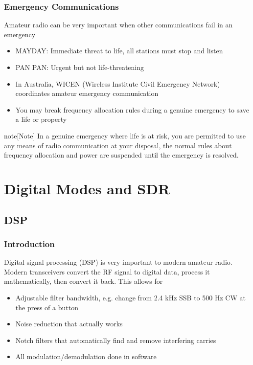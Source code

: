 \documentclass{article}
\begin{document}
\subsubsection{Emergency Communications}
Amateur radio can be very important when other communications fail in an emergency
\begin{itemize}
    \item MAYDAY: Immediate threat to life, all stations must stop and listen
    \item PAN PAN: Urgent but not life-threatening
    \item In Australia, WICEN (Wireless Institute Civil Emergency Network) coordinates amateur emergency communication
    \item You may break frequency allocation rules during a genuine emergency to save a life or property
\end{itemize}

\begin{callout}{note}[Note]
    In a genuine emergency where life is at risk, you are permitted to use any means of radio communication at your disposal, the normal rules about frequency allocation and power are suspended until the emergency is resolved.
\end{callout}

\section{Digital Modes and SDR}
\subsection{DSP}
\subsubsection{Introduction}
Digital signal processing (DSP) is very important to modern amateur radio. Modern transceivers convert the RF signal to digital data, process it mathematically, then convert it back. This allows for
\begin{itemize}
    \item Adjustable filter bandwidth, e.g. change from 2.4 kHz SSB to 500 Hz CW at the press of a button
    \item Noise reduction that actually works
    \item Notch filters that automatically find and remove interfering carries
    \item All modulation/demodulation done in software
\end{itemize}
\end{document}
